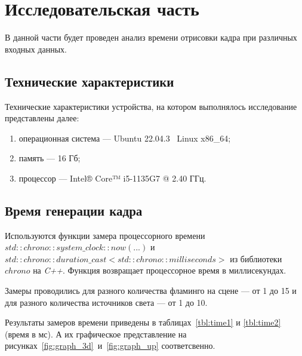 \chapter{Исследовательская часть}

В данной части будет проведен анализ времени отрисовки кадра при различных входных данных.

\section{Технические характеристики}

Технические характеристики устройства, на котором выполнялось исследование представлены далее:

\begin{enumerate}[label=\arabic*)]
	\item операционная система --- Ubuntu 22.04.3~\cite{ubuntu} Linux x86\_64;
	\item память --- 16 Гб;
	\item процессор --- Intel® Core™ i5-1135G7 @ 2.40 ГГц.
\end{enumerate}

\section{Время генерации кадра}

Используются функции замера процессорного времени \textit{$std::chrono::system\_clock::now(...)$} и \textit{$std::chrono::duration\_cast<std::chrono::milliseconds>$} из библиотеки $chrono$ на \textit{C++}. Функция возвращает процессорное время в миллисекундах.

Замеры проводились для разного количества фламинго на сцене --- от 1 до 15 и для разного количества источников света --- от 1 до 10.

Результаты замеров времени приведены в таблицах~\ref{tbl:time1} и \ref{tbl:time2} (время в мс). А их графическое представление на рисунках~\ref{fig:graph_3d}~и~\ref{fig:graph_up} соответсвенно.

